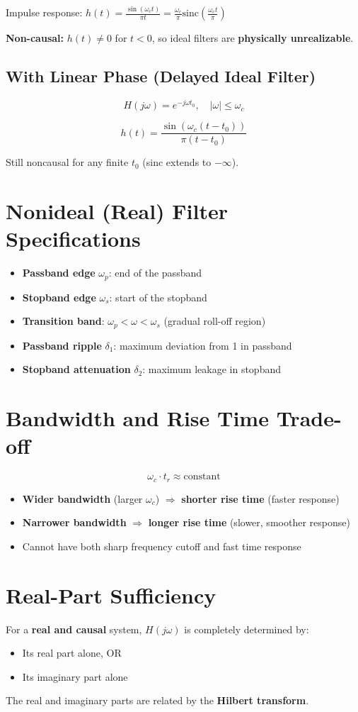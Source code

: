 \documentclass[11pt]{article}
\begin{document}
Impulse response: $h(t) = \frac{\sin(\omega_c t)}{\pi t} = \frac{\omega_c}{\pi} \text{sinc}\left(\frac{\omega_c t}{\pi}\right)$

\textbf{Non-causal:} $h(t) \neq 0$ for $t < 0$, so ideal filters are \textbf{physically unrealizable}.

\subsection*{With Linear Phase (Delayed Ideal Filter)}

\[H(j\omega) = e^{-j\omega t_0}, \quad |\omega| \leq \omega_c\]

\[h(t) = \frac{\sin(\omega_c(t - t_0))}{\pi(t - t_0)}\]

Still noncausal for any finite $t_0$ (sinc extends to $-\infty$).

\section*{Nonideal (Real) Filter Specifications}

\begin{itemize}
  \item \textbf{Passband edge} $\omega_p$: end of the passband
  \item \textbf{Stopband edge} $\omega_s$: start of the stopband
  \item \textbf{Transition band}: $\omega_p < \omega < \omega_s$ (gradual roll-off region)
  \item \textbf{Passband ripple} $\delta_1$: maximum deviation from 1 in passband
  \item \textbf{Stopband attenuation} $\delta_2$: maximum leakage in stopband
\end{itemize}

\section*{Bandwidth and Rise Time Trade-off}

\[\omega_c \cdot t_r \approx \text{constant}\]

\begin{itemize}
  \item \textbf{Wider bandwidth} (larger $\omega_c$) $\Rightarrow$ \textbf{shorter rise time} (faster response)
  \item \textbf{Narrower bandwidth} $\Rightarrow$ \textbf{longer rise time} (slower, smoother response)
  \item Cannot have both sharp frequency cutoff and fast time response
\end{itemize}

\section*{Real-Part Sufficiency}

For a \textbf{real and causal} system, $H(j\omega)$ is completely determined by:
\begin{itemize}
  \item Its real part alone, OR
  \item Its imaginary part alone
\end{itemize}

The real and imaginary parts are related by the \textbf{Hilbert transform}.
\end{document}
